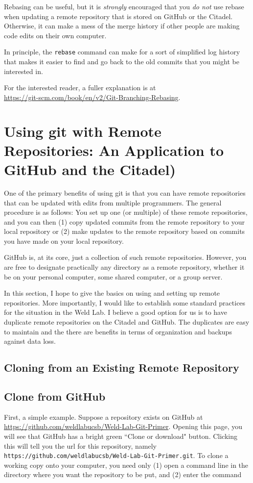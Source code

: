 \documentclass[11pt]{article}
\begin{document}
Rebasing can be useful, but it is \emph{strongly} encouraged that you \emph{do not} use rebase when updating a remote repository that is stored on GitHub or the Citadel.  Otherwise, it can make a mess of the merge history if other people are making code edits on their own computer.

In principle, the \texttt{rebase} command can make for a sort of simplified log history that makes it easier to find and go back to the old commits that you might be interested in.

For the interested reader, a fuller explanation is at\\ \url{https://git-scm.com/book/en/v2/Git-Branching-Rebasing}.

\section{Using git with Remote Repositories: An Application to GitHub and the Citadel)}
\label{sec:Remotes}

One of the primary benefits of using git is that you can have remote repositories that can be updated with edits from multiple programmers.  The general procedure is as follows: You set up one (or multiple) of these remote repositories, and you can then (1) copy updated commits from the remote repository to your local repository or (2) make updates to the remote repository based on commits you have made on your local repository.

GitHub is, at its core, just a collection of such remote repositories.  However, you are free to designate practically any directory as a remote repository, whether it be on your personal computer, some shared computer, or a group server.

In this section, I hope to give the basics on using and setting up remote repositories.  More importantly, I would like to establish some standard practices for the situation in the Weld Lab.  I believe a good option for us is to have duplicate remote repositories on the Citadel and GitHub. The duplicates are easy to maintain and the there are benefits in terms of organization and backups against data loss.

\subsection{Cloning from an Existing Remote Repository}

\subsection{Clone from GitHub}
First, a simple example.  Suppose a repository exists on GitHub at \newline\url{https://github.com/weldlabucsb/Weld-Lab-Git-Primer}.  Opening this page, you will see that GitHub has a bright green ``Clone or download" button.  Clicking this will tell you the url for this repository, namely \texttt{https://github.com/weldlabucsb/Weld-Lab-Git-Primer.git}.  To clone a working copy onto your computer, you need only (1) open a command line in the directory where you want the repository to be put, and (2) enter the command
\end{document}
